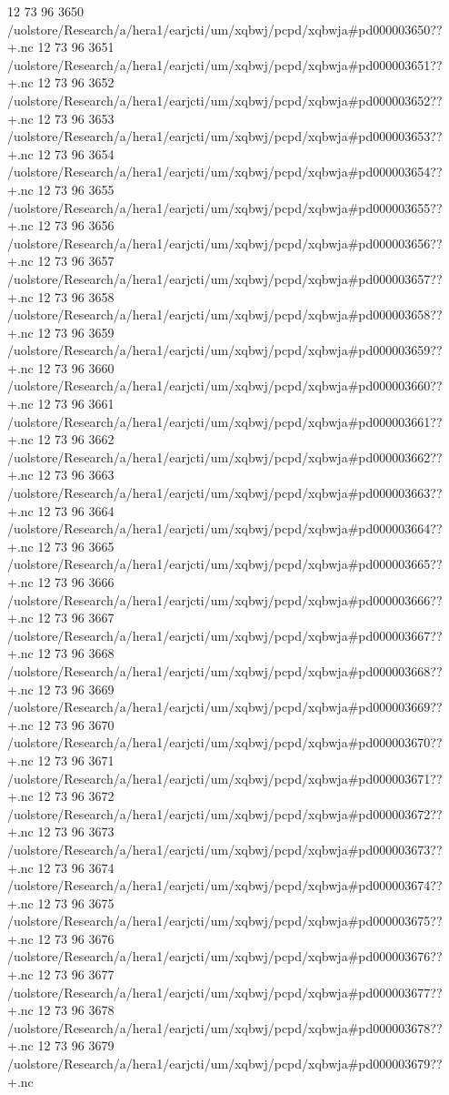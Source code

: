 12 73 96
3650
/uolstore/Research/a/hera1/earjcti/um/xqbwj/pcpd/xqbwja#pd000003650??+.nc
12 73 96
3651
/uolstore/Research/a/hera1/earjcti/um/xqbwj/pcpd/xqbwja#pd000003651??+.nc
12 73 96
3652
/uolstore/Research/a/hera1/earjcti/um/xqbwj/pcpd/xqbwja#pd000003652??+.nc
12 73 96
3653
/uolstore/Research/a/hera1/earjcti/um/xqbwj/pcpd/xqbwja#pd000003653??+.nc
12 73 96
3654
/uolstore/Research/a/hera1/earjcti/um/xqbwj/pcpd/xqbwja#pd000003654??+.nc
12 73 96
3655
/uolstore/Research/a/hera1/earjcti/um/xqbwj/pcpd/xqbwja#pd000003655??+.nc
12 73 96
3656
/uolstore/Research/a/hera1/earjcti/um/xqbwj/pcpd/xqbwja#pd000003656??+.nc
12 73 96
3657
/uolstore/Research/a/hera1/earjcti/um/xqbwj/pcpd/xqbwja#pd000003657??+.nc
12 73 96
3658
/uolstore/Research/a/hera1/earjcti/um/xqbwj/pcpd/xqbwja#pd000003658??+.nc
12 73 96
3659
/uolstore/Research/a/hera1/earjcti/um/xqbwj/pcpd/xqbwja#pd000003659??+.nc
12 73 96
3660
/uolstore/Research/a/hera1/earjcti/um/xqbwj/pcpd/xqbwja#pd000003660??+.nc
12 73 96
3661
/uolstore/Research/a/hera1/earjcti/um/xqbwj/pcpd/xqbwja#pd000003661??+.nc
12 73 96
3662
/uolstore/Research/a/hera1/earjcti/um/xqbwj/pcpd/xqbwja#pd000003662??+.nc
12 73 96
3663
/uolstore/Research/a/hera1/earjcti/um/xqbwj/pcpd/xqbwja#pd000003663??+.nc
12 73 96
3664
/uolstore/Research/a/hera1/earjcti/um/xqbwj/pcpd/xqbwja#pd000003664??+.nc
12 73 96
3665
/uolstore/Research/a/hera1/earjcti/um/xqbwj/pcpd/xqbwja#pd000003665??+.nc
12 73 96
3666
/uolstore/Research/a/hera1/earjcti/um/xqbwj/pcpd/xqbwja#pd000003666??+.nc
12 73 96
3667
/uolstore/Research/a/hera1/earjcti/um/xqbwj/pcpd/xqbwja#pd000003667??+.nc
12 73 96
3668
/uolstore/Research/a/hera1/earjcti/um/xqbwj/pcpd/xqbwja#pd000003668??+.nc
12 73 96
3669
/uolstore/Research/a/hera1/earjcti/um/xqbwj/pcpd/xqbwja#pd000003669??+.nc
12 73 96
3670
/uolstore/Research/a/hera1/earjcti/um/xqbwj/pcpd/xqbwja#pd000003670??+.nc
12 73 96
3671
/uolstore/Research/a/hera1/earjcti/um/xqbwj/pcpd/xqbwja#pd000003671??+.nc
12 73 96
3672
/uolstore/Research/a/hera1/earjcti/um/xqbwj/pcpd/xqbwja#pd000003672??+.nc
12 73 96
3673
/uolstore/Research/a/hera1/earjcti/um/xqbwj/pcpd/xqbwja#pd000003673??+.nc
12 73 96
3674
/uolstore/Research/a/hera1/earjcti/um/xqbwj/pcpd/xqbwja#pd000003674??+.nc
12 73 96
3675
/uolstore/Research/a/hera1/earjcti/um/xqbwj/pcpd/xqbwja#pd000003675??+.nc
12 73 96
3676
/uolstore/Research/a/hera1/earjcti/um/xqbwj/pcpd/xqbwja#pd000003676??+.nc
12 73 96
3677
/uolstore/Research/a/hera1/earjcti/um/xqbwj/pcpd/xqbwja#pd000003677??+.nc
12 73 96
3678
/uolstore/Research/a/hera1/earjcti/um/xqbwj/pcpd/xqbwja#pd000003678??+.nc
12 73 96
3679
/uolstore/Research/a/hera1/earjcti/um/xqbwj/pcpd/xqbwja#pd000003679??+.nc
